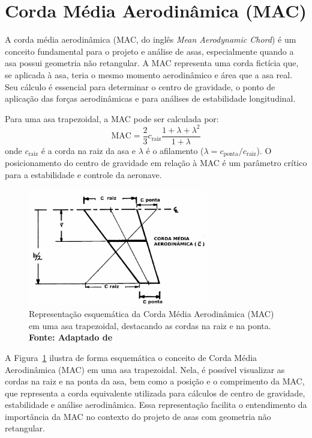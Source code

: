 \section{Corda Média Aerodinâmica (MAC)}
A corda média aerodinâmica (MAC, do inglês \textit{Mean Aerodynamic Chord}) é um conceito fundamental para o projeto e análise de asas, especialmente quando a asa possui geometria não retangular. A MAC representa uma corda fictícia que, se aplicada à asa, teria o mesmo momento aerodinâmico e área que a asa real. Seu cálculo é essencial para determinar o centro de gravidade, o ponto de aplicação das forças aerodinâmicas e para análises de estabilidade longitudinal.

Para uma asa trapezoidal, a MAC pode ser calculada por:
\[
\text{MAC} = \frac{2}{3} c_\text{raiz} \frac{1 + \lambda + \lambda^2}{1 + \lambda}
\]
onde \(c_\text{raiz}\) é a corda na raiz da asa e \(\lambda\) é o afilamento (\(\lambda = c_\text{ponta}/c_\text{raiz}\)). O posicionamento do centro de gravidade em relação à MAC é um parâmetro crítico para a estabilidade e controle da aeronave.

\begin{figure}[H]
    \centering
    \includegraphics[width=0.7\textwidth]{figures/mac_trapezio.jpg}
    \caption{Representação esquemática da Corda Média Aerodinâmica (MAC) em uma asa trapezoidal, destacando as cordas na raiz e na ponta. \textbf{Fonte: Adaptado de \cite{raymer2018aircraft}}}
    \label{fig:mac_exemplo}
\end{figure}

A Figura~\ref{fig:mac_exemplo} ilustra de forma esquemática o conceito de Corda Média Aerodinâmica (MAC) em uma asa trapezoidal. Nela, é possível visualizar as cordas na raiz e na ponta da asa, bem como a posição e o comprimento da MAC, que representa a corda equivalente utilizada para cálculos de centro de gravidade, estabilidade e análise aerodinâmica. Essa representação facilita o entendimento da importância da MAC no contexto do projeto de asas com geometria não retangular.


